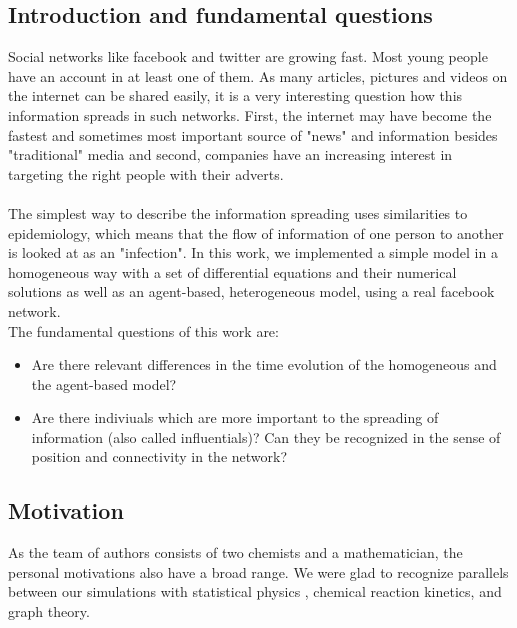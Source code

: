 \subsection{Introduction and fundamental questions}

Social networks like facebook and twitter are growing fast. Most young people have an account in at least one of them. As many articles, pictures and videos on the internet can be shared easily, it is a very interesting question how this information spreads in such networks. First, the internet may have become the fastest and sometimes most important source of "news" and information besides "traditional" media and second, companies have an increasing interest in targeting the right people with their adverts. 
\\
\\
The simplest way to describe the information spreading uses similarities to epidemiology, which means that the flow of information of one person to another is looked at as an "infection". In this work, we implemented a simple model in a homogeneous way with a set of differential equations and their numerical solutions as well as an agent-based, heterogeneous model, using a real facebook network.
\\
The fundamental questions of this work are:

\begin{itemize}
\item Are there relevant differences in the time evolution of the homogeneous and the agent-based model?

\item Are there indiviuals which are more important to the spreading of information (also called influentials)? Can they be recognized in the sense of position and connectivity in the network?
\end{itemize}

\subsection{Motivation}

As the team of authors consists of two chemists and a mathematician, the personal motivations also have a broad range. We were glad to recognize parallels between our simulations with statistical physics , chemical reaction kinetics, and graph theory. 














